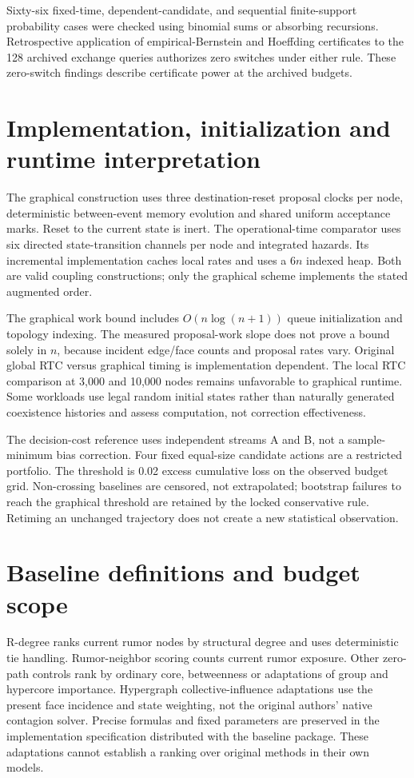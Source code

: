 \documentclass[preprint,11pt,sort&compress]{elsarticle}
\begin{document}
Sixty-six fixed-time, dependent-candidate, and sequential finite-support probability cases were checked using binomial sums or absorbing recursions. Retrospective application of empirical-Bernstein and Hoeffding certificates to the 128 archived exchange queries authorizes zero switches under either rule. These zero-switch findings describe certificate power at the archived budgets.

\FloatBarrier\section{Implementation, initialization and runtime interpretation}
The graphical construction uses three destination-reset proposal clocks per node, deterministic between-event memory evolution and shared uniform acceptance marks. Reset to the current state is inert. The operational-time comparator uses six directed state-transition channels per node and integrated hazards. Its incremental implementation caches local rates and uses a $6n$ indexed heap. Both are valid coupling constructions; only the graphical scheme implements the stated augmented order.

The graphical work bound includes $O(n\log(n+1))$ queue initialization and topology indexing. The measured proposal-work slope does not prove a bound solely in $n$, because incident edge/face counts and proposal rates vary. Original global RTC versus graphical timing is implementation dependent. The local RTC comparison at 3,000 and 10,000 nodes remains unfavorable to graphical runtime. Some workloads use legal random initial states rather than naturally generated coexistence histories and assess computation, not correction effectiveness.

The decision-cost reference uses independent streams A and B, not a sample-minimum bias correction. Four fixed equal-size candidate actions are a restricted portfolio. The threshold is 0.02 excess cumulative loss on the observed budget grid. Non-crossing baselines are censored, not extrapolated; bootstrap failures to reach the graphical threshold are retained by the locked conservative rule. Retiming an unchanged trajectory does not create a new statistical observation.

\FloatBarrier\section{Baseline definitions and budget scope}
R-degree ranks current rumor nodes by structural degree and uses deterministic tie handling. Rumor-neighbor scoring counts current rumor exposure. Other zero-path controls rank by ordinary core, betweenness or adaptations of group and hypercore importance. Hypergraph collective-influence adaptations use the present face incidence and state weighting, not the original authors' native contagion solver. Precise formulas and fixed parameters are preserved in the implementation specification distributed with the baseline package. These adaptations cannot establish a ranking over original methods in their own models.
\end{document}
